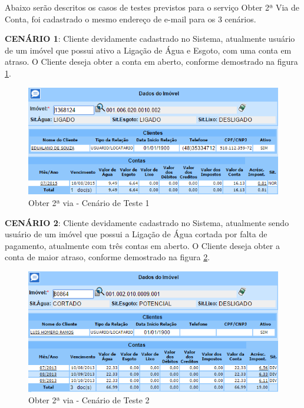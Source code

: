 Abaixo serão descritos os casos de testes previstos para o serviço Obter 2ª Via de Conta, foi cadastrado o mesmo endereço de e-mail para os 3 cenários.
\begin{flushleft}
	\begin{description}
		\item \textbf{CENÁRIO 1}: Cliente devidamente cadastrado no Sistema, atualmente usuário de um imóvel que possui ativo a Ligação de Água e Esgoto, com uma conta em atraso. O Cliente deseja obter a conta em aberto, conforme demostrado na figura \ref{figura:2ViaCenario1}.
		\begin{figure}[H]
			\centering
			\caption{Obter 2ª via - Cenário de Teste 1}
			\label{figura:2ViaCenario1}
			\includegraphics{figuras/cenarios/segunda_via/cenario_1.PNG}
		\end{figure}
	\end{description}
	
	\begin{description}
		\item \textbf{CENÁRIO 2}: Cliente devidamente cadastrado no Sistema, atualmente sendo usuário de um imóvel que possui a Ligação de Água cortada por falta de pagamento, atualmente com três contas em aberto. O Cliente deseja obter a conta de maior atraso, conforme demostrado na figura \ref{figura:2ViaCenario2}.
		\begin{figure}[H]
			\centering
			\caption{Obter 2ª via - Cenário de Teste 2}
			\label{figura:2ViaCenario2}
			\includegraphics{figuras/cenarios/segunda_via/cenario_2.PNG}
			\legend {\fontsize{10}{12}\selectfont {Fonte: Autoria Própria}.}	
		\end{figure}
	\end{description}
	

\end{flushleft}

